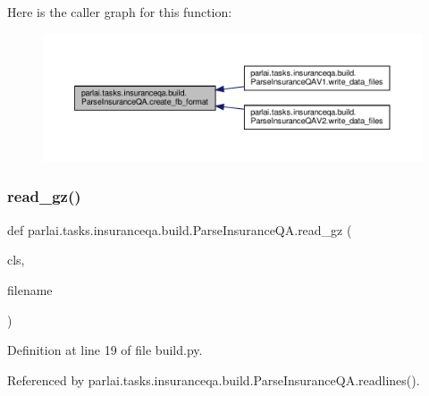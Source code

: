 Here is the caller graph for this function\+:
\nopagebreak
\begin{figure}[H]
\begin{center}
\leavevmode
\includegraphics[width=350pt]{classparlai_1_1tasks_1_1insuranceqa_1_1build_1_1ParseInsuranceQA_a05c7792ef7e45fe67f6e964d2f73f852_icgraph}
\end{center}
\end{figure}
\mbox{\label{classparlai_1_1tasks_1_1insuranceqa_1_1build_1_1ParseInsuranceQA_a3f2322d59e42f329387912bd3d03c888}} 
\subsubsection{\texorpdfstring{read\+\_\+gz()}{read\_gz()}}
{\footnotesize\ttfamily def parlai.\+tasks.\+insuranceqa.\+build.\+Parse\+Insurance\+Q\+A.\+read\+\_\+gz (\begin{DoxyParamCaption}\item[{}]{cls,  }\item[{}]{filename }\end{DoxyParamCaption})}



Definition at line 19 of file build.\+py.



Referenced by parlai.\+tasks.\+insuranceqa.\+build.\+Parse\+Insurance\+Q\+A.\+readlines().

